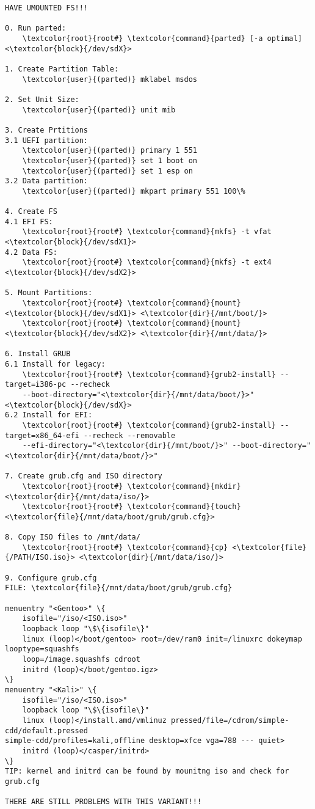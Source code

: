 \documentclass[10pt, a4paper, onecolumn, openany]{book}         %
\begin{document}
\begin{Verbatim}[commandchars=\\\{\}]
HAVE UMOUNTED FS!!!

0. Run parted:
    \textcolor{root}{root#} \textcolor{command}{parted} [-a optimal] <\textcolor{block}{/dev/sdX}>

1. Create Partition Table:
    \textcolor{user}{(parted)} mklabel msdos
    
2. Set Unit Size:
    \textcolor{user}{(parted)} unit mib
    
3. Create Prtitions
3.1 UEFI partition:
    \textcolor{user}{(parted)} primary 1 551
    \textcolor{user}{(parted)} set 1 boot on
    \textcolor{user}{(parted)} set 1 esp on
3.2 Data partition:
    \textcolor{user}{(parted)} mkpart primary 551 100\%

4. Create FS
4.1 EFI FS:
    \textcolor{root}{root#} \textcolor{command}{mkfs} -t vfat <\textcolor{block}{/dev/sdX1}>
4.2 Data FS:
    \textcolor{root}{root#} \textcolor{command}{mkfs} -t ext4 <\textcolor{block}{/dev/sdX2}>
    
5. Mount Partitions:
    \textcolor{root}{root#} \textcolor{command}{mount} <\textcolor{block}{/dev/sdX1}> <\textcolor{dir}{/mnt/boot/}>
    \textcolor{root}{root#} \textcolor{command}{mount} <\textcolor{block}{/dev/sdX2}> <\textcolor{dir}{/mnt/data/}>

6. Install GRUB
6.1 Install for legacy:
    \textcolor{root}{root#} \textcolor{command}{grub2-install} --target=i386-pc --recheck 
    --boot-directory="<\textcolor{dir}{/mnt/data/boot/}>" <\textcolor{block}{/dev/sdX}>
6.2 Install for EFI:
    \textcolor{root}{root#} \textcolor{command}{grub2-install} --target=x86_64-efi --recheck --removable
    --efi-directory="<\textcolor{dir}{/mnt/boot/}>" --boot-directory="<\textcolor{dir}{/mnt/data/boot/}>"

7. Create grub.cfg and ISO directory
    \textcolor{root}{root#} \textcolor{command}{mkdir} <\textcolor{dir}{/mnt/data/iso/}>
    \textcolor{root}{root#} \textcolor{command}{touch} <\textcolor{file}{/mnt/data/boot/grub/grub.cfg}>

8. Copy ISO files to /mnt/data/
    \textcolor{root}{root#} \textcolor{command}{cp} <\textcolor{file}{/PATH/ISO.iso}> <\textcolor{dir}{/mnt/data/iso/}>
    
9. Configure grub.cfg
FILE: \textcolor{file}{/mnt/data/boot/grub/grub.cfg}

menuentry "<Gentoo>" \{
    isofile="/iso/<ISO.iso>"
    loopback loop "\$\{isofile\}"
    linux (loop)</boot/gentoo> root=/dev/ram0 init=/linuxrc dokeymap
looptype=squashfs 
    loop=/image.squashfs cdroot
    initrd (loop)</boot/gentoo.igz>
\}
menuentry "<Kali>" \{
    isofile="/iso/<ISO.iso>"
    loopback loop "\$\{isofile\}"
    linux (loop)</install.amd/vmlinuz pressed/file=/cdrom/simple-cdd/default.pressed
simple-cdd/profiles=kali,offline desktop=xfce vga=788 --- quiet> 
    initrd (loop)</casper/initrd>
\}
TIP: kernel and initrd can be found by mounitng iso and check for grub.cfg

THERE ARE STILL PROBLEMS WITH THIS VARIANT!!!
\end{Verbatim}
\end{document}
